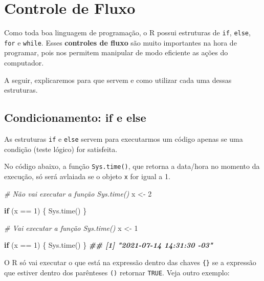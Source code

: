 \documentclass[
]{book}
\newenvironment{Shaded}{\begin{snugshade}}{\end{snugshade}}
\newcommand{\CommentTok}[1]{\textcolor[rgb]{0.56,0.35,0.01}{\textit{#1}}}
\newcommand{\ControlFlowTok}[1]{\textcolor[rgb]{0.13,0.29,0.53}{\textbf{#1}}}
\newcommand{\DecValTok}[1]{\textcolor[rgb]{0.00,0.00,0.81}{#1}}
\newcommand{\DocumentationTok}[1]{\textcolor[rgb]{0.56,0.35,0.01}{\textbf{\textit{#1}}}}
\newcommand{\FunctionTok}[1]{\textcolor[rgb]{0.00,0.00,0.00}{#1}}
\newcommand{\NormalTok}[1]{#1}
\newcommand{\OtherTok}[1]{\textcolor[rgb]{0.56,0.35,0.01}{#1}}
\newcommand{\SpecialCharTok}[1]{\textcolor[rgb]{0.00,0.00,0.00}{#1}}
\begin{document}
\hypertarget{controle-de-fluxo}{%
\section{Controle de Fluxo}\label{controle-de-fluxo}}

Como toda boa linguagem de programação, o R possui estruturas de \texttt{if}, \texttt{else}, \texttt{for} e \texttt{while}. Esses \textbf{controles de fluxo} são muito importantes na hora de programar, pois nos permitem manipular de modo eficiente as ações do computador.

A seguir, explicaremos para que servem e como utilizar cada uma dessas estruturas.

\hypertarget{condicionamento-if-e-else}{%
\subsection{Condicionamento: if e else}\label{condicionamento-if-e-else}}

As estruturas \texttt{if} e \texttt{else} servem para executarmos um código apenas se uma condição (teste lógico) for satisfeita.

No código abaixo, a função \texttt{Sys.time()}, que retorna a data/hora no momento da execução, só será avlaiada se o objeto \texttt{x} for igual a 1.

\begin{Shaded}
\begin{Highlighting}[]
\CommentTok{\# Não vai executar a função Sys.time()}
\NormalTok{x }\OtherTok{\textless{}{-}} \DecValTok{2}

\ControlFlowTok{if}\NormalTok{ (x }\SpecialCharTok{==} \DecValTok{1}\NormalTok{) \{         }
  \FunctionTok{Sys.time}\NormalTok{()}
\NormalTok{\}}

\CommentTok{\# Vai executar a função Sys.time()}
\NormalTok{x }\OtherTok{\textless{}{-}} \DecValTok{1}

\ControlFlowTok{if}\NormalTok{ (x }\SpecialCharTok{==} \DecValTok{1}\NormalTok{) \{         }
  \FunctionTok{Sys.time}\NormalTok{()}
\NormalTok{\}}
\DocumentationTok{\#\# [1] "2021{-}07{-}14 14:31:30 {-}03"}
\end{Highlighting}
\end{Shaded}

O R só vai executar o que está na expressão dentro das chaves \texttt{\{\}} se a expressão que estiver dentro dos parênteses \texttt{()} retornar \texttt{TRUE}. Veja outro exemplo:
\end{document}
